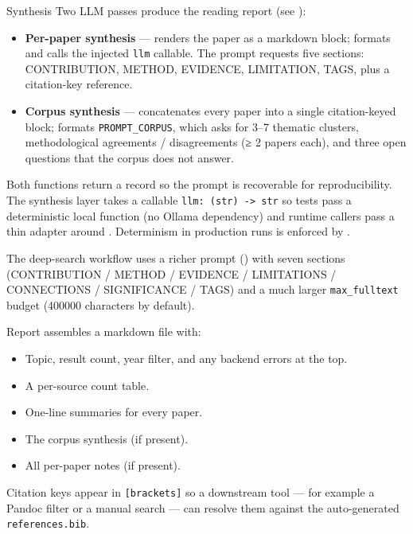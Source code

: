 \documentclass[
  ignorenonframetext,
]{beamer}
\providecommand{\tightlist}{%
  \setlength{\itemsep}{0pt}\setlength{\parskip}{0pt}}
\begin{document}
\begin{frame}{Synthesis}
\protect{}\label{synthesis}
Two LLM passes produce the reading report (see
):

\begin{itemize}
\tightlist
\item
  \textbf{Per-paper synthesis} ---
  renders the paper as a markdown block; 
  formats  and calls the injected
  \texttt{llm} callable. The prompt requests five sections:
  CONTRIBUTION, METHOD, EVIDENCE, LIMITATION, TAGS, plus a citation-key
  reference.
\item
  \textbf{Corpus synthesis} --- 
  concatenates every paper into a single citation-keyed block;
   formats \texttt{PROMPT\_CORPUS}, which
  asks for 3--7 thematic clusters, methodological agreements /
  disagreements (≥ 2 papers each), and three open questions that the
  corpus does not answer.
\end{itemize}

Both functions return a
 record so the
prompt is recoverable for reproducibility. The synthesis layer takes a
callable \texttt{llm:\ (str)\ -\textgreater{}\ str} so tests pass a
deterministic local function (no Ollama dependency) and runtime callers
pass a thin adapter around .
Determinism in production runs is enforced by
.

The deep-search workflow uses a richer prompt
() with seven sections
(CONTRIBUTION / METHOD / EVIDENCE / LIMITATIONS / CONNECTIONS /
SIGNIFICANCE / TAGS) and a much larger \texttt{max\_fulltext} budget
(400000 characters by default).
\end{frame}

\begin{frame}{Report}
\protect{}\label{report}
 assembles a markdown file
with:

\begin{itemize}
\tightlist
\item
  Topic, result count, year filter, and any backend errors at the top.
\item
  A per-source count table.
\item
  One-line summaries for every paper.
\item
  The corpus synthesis (if present).
\item
  All per-paper notes (if present).
\end{itemize}

Citation keys appear in \texttt{{[}brackets{]}} so a downstream tool ---
for example a Pandoc filter or a manual search --- can resolve them
against the auto-generated \texttt{references.bib}.
\end{frame}
\end{document}
